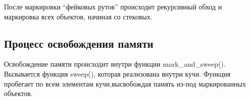После маркировки ``фейковых рутов'' происходит рекурсивный обход и маркировка всех объектов, начиная со стековых.

\subsection{Процесс освобождения памяти}

Освобождение памяти происходит внутри функции mark\_and\_sweep(). Вызывается функция sweep(), которая реализована внутри кучи. Функция пробегает по всем элементам кучи,высвобождая память из-под маркированных объектов.